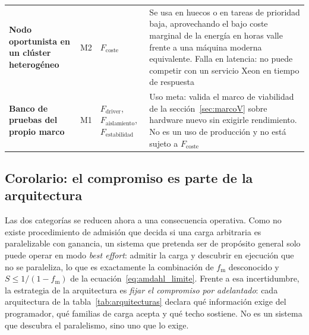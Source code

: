 \documentclass[a4paper,11pt]{article}
\begin{document}
\begin{table}[t]
\begin{tabular}{>{\raggedright\arraybackslash}p{2.8cm} >{\raggedright\arraybackslash}p{2.6cm} >{\raggedright\arraybackslash}p{3.4cm} >{\raggedright\arraybackslash}p{5.4cm}}
\textbf{Nodo oportunista en un clúster heterogéneo} & M2 & $F_{\text{coste}}$ & Se usa en huecos o en tareas de prioridad baja, aprovechando el bajo coste marginal de la energía en horas valle frente a una máquina moderna equivalente. Falla en latencia: no puede competir con un servicio Xeon en tiempo de respuesta \\
\textbf{Banco de pruebas del propio marco} & M1 & $F_{\text{driver}}$, $F_{\text{aislamiento}}$, $F_{\text{estabilidad}}$ & Uso meta: valida el marco de viabilidad de la sección~\ref{sec:marcoV} sobre hardware nuevo sin exigirle rendimiento. No es un uso de producción y no está sujeto a $F_{\text{coste}}$ \\
\bottomrule
\end{tabular}
\end{table}

\subsection*{Corolario: el compromiso es parte de la arquitectura}

Las dos categorías se reducen ahora a una consecuencia operativa. Como no existe procedimiento de admisión que decida si una
carga arbitraria es paralelizable con ganancia, un sistema que pretenda ser de propósito general solo puede operar
en modo \emph{best effort}: admitir la carga y descubrir en ejecución que no se paraleliza, lo que es exactamente la
combinación de $f_{\text{m}}$ desconocido y $S \le 1/(1-f_{\text{m}})$ de la ecuación~\eqref{eq:amdahl_limite}. Frente a esa
incertidumbre, la estrategia de la arquitectura es \emph{fijar el compromiso por adelantado}: cada arquitectura de la
tabla~\ref{tab:arquitecturas} declara qué información exige del programador, qué familias de carga acepta y qué techo
sostiene. No es un sistema que descubra el paralelismo, sino uno que lo exige.
\end{document}

